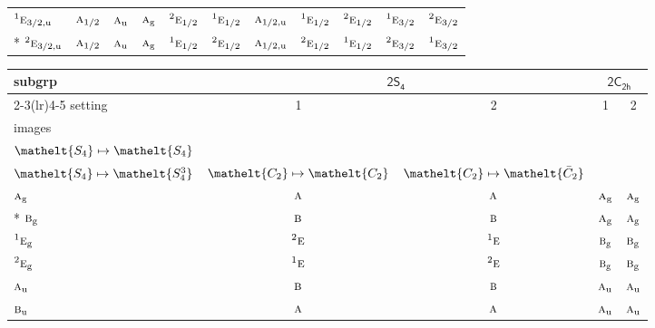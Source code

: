 \documentclass[10pt,a4paper]{article}
\numberwithin{equation}{section}
\newcommand{\eltfont}[1]{{\let\sigma\eltsigma\mathelt{#1}}}
\newcommand{\grp}[1]{\mathsf{#1}}
\newcommand{\irr}[1]{\text{\normalfont\scshape #1}}
\newcommand{\conjpair}[1]{{}^{#1}}
\newcommand{\cls}[1]{\eltfont{#1}}
\newcommand{\ptag}[1]{\mathrm{#1}}
\newcommand{\barred}[1]{\bar{#1}}
\begin{document}
{\begin{longtable}{@{}lcccccccccc@{}}
$\conjpair{1}\irr{e}_{3/2,\ptag{u}}$ & $\irr{a}_{1/2}$ & $\irr{a}_{\ptag{u}}$ & $\irr{a}_{\ptag{g}}$ & $\conjpair{2}\irr{e}_{1/2}$ & $\conjpair{1}\irr{e}_{1/2}$ & $\irr{a}_{1/2,\ptag{u}}$ & $\conjpair{1}\irr{e}_{1/2}$ & $\conjpair{2}\irr{e}_{1/2}$ & $\conjpair{1}\irr{e}_{3/2}$ & $\conjpair{2}\irr{e}_{3/2}$\\*
$\conjpair{2}\irr{e}_{3/2,\ptag{u}}$ & $\irr{a}_{1/2}$ & $\irr{a}_{\ptag{u}}$ & $\irr{a}_{\ptag{g}}$ & $\conjpair{1}\irr{e}_{1/2}$ & $\conjpair{2}\irr{e}_{1/2}$ & $\irr{a}_{1/2,\ptag{u}}$ & $\conjpair{2}\irr{e}_{1/2}$ & $\conjpair{1}\irr{e}_{1/2}$ & $\conjpair{2}\irr{e}_{3/2}$ & $\conjpair{1}\irr{e}_{3/2}$\\
\bottomrule\end{longtable}}
{\small\begin{longtable}{@{}lcccc@{}}\toprule
subgrp & \multicolumn{2}{c}{\href{2S4.pdf}{$\grp{2S_{4}}$}} & \multicolumn{2}{c}{\href{2C2h.pdf}{$\grp{2C_{2h}}$}}\\\cmidrule(lr){2-3}\cmidrule(lr){4-5}
setting & 1 & 2 & 1 & 2\\
images & {\scriptsize\begin{tabular}[t]{@{}c@{}}$\cls{C_{2}} \mapsto \cls{C_{2}}$\\$\cls{S_{4}} \mapsto \cls{S_{4}}$\end{tabular}} & {\scriptsize\begin{tabular}[t]{@{}c@{}}$\cls{C_{2}} \mapsto \cls{\barred{C}_{2}}$\\$\cls{S_{4}} \mapsto \cls{S_{4}^{3}}$\end{tabular}} & {\scriptsize $\cls{C_{2}} \mapsto \cls{C_{2}}$} & {\scriptsize $\cls{C_{2}} \mapsto \cls{\barred{C}_{2}}$}\\\midrule\endhead
\bottomrule\endfoot\endlastfoot
$\irr{a}_{\ptag{g}}$ & $\irr{a}$ & $\irr{a}$ & $\irr{a}_{\ptag{g}}$ & $\irr{a}_{\ptag{g}}$\\*
$\irr{b}_{\ptag{g}}$ & $\irr{b}$ & $\irr{b}$ & $\irr{a}_{\ptag{g}}$ & $\irr{a}_{\ptag{g}}$\\
$\conjpair{1}\irr{e}_{\ptag{g}}$ & $\conjpair{2}\irr{e}$ & $\conjpair{1}\irr{e}$ & $\irr{b}_{\ptag{g}}$ & $\irr{b}_{\ptag{g}}$\\
$\conjpair{2}\irr{e}_{\ptag{g}}$ & $\conjpair{1}\irr{e}$ & $\conjpair{2}\irr{e}$ & $\irr{b}_{\ptag{g}}$ & $\irr{b}_{\ptag{g}}$\\
$\irr{a}_{\ptag{u}}$ & $\irr{b}$ & $\irr{b}$ & $\irr{a}_{\ptag{u}}$ & $\irr{a}_{\ptag{u}}$\\
$\irr{b}_{\ptag{u}}$ & $\irr{a}$ & $\irr{a}$ & $\irr{a}_{\ptag{u}}$ & $\irr{a}_{\ptag{u}}$\\

\end{longtable}}
\end{document}

